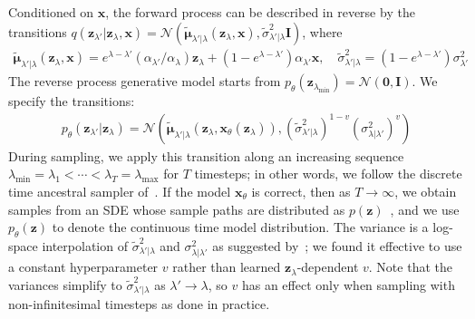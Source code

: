 \documentclass{article} %
\newcommand{\bI}{\mathbf{I}}
\newcommand{\bzero}{\mathbf{0}}
\newcommand{\bx}{\mathbf{x}}
\newcommand{\bz}{\mathbf{z}}
\newcommand{\bmu}{{\boldsymbol{\mu}}}
\begin{document}
Conditioned on $\bx$, the forward process can be described in reverse by the transitions
$q(\bz_{\lambda'}|\bz_\lambda,\bx) = \mathcal{N}(\tilde\bmu_{\lambda'|\lambda}(\bz_\lambda,\bx), \tilde\sigma^2_{\lambda'|\lambda}\bI)$,
where
\begin{align}
\tilde\bmu_{\lambda'|\lambda}(\bz_\lambda,\bx) = e^{\lambda-\lambda'}(\alpha_{\lambda'}/\alpha_{\lambda})\bz_\lambda + (1-e^{\lambda - \lambda'})\alpha_{\lambda'}\bx,
\quad \tilde\sigma^2_{\lambda'|\lambda} = (1-e^{\lambda-\lambda'})\sigma_{\lambda'}^2
\end{align}
The reverse process generative model starts from $p_\theta(\bz_{\lambda_{\mathrm{min}}}) = \mathcal{N}(\bzero, \bI)$. We specify the transitions:
\begin{align}p_\theta(\bz_{\lambda'}|\bz_{\lambda}) = \mathcal{N}(\tilde\bmu_{\lambda'|\lambda}(\bz_\lambda,\bx_\theta(\bz_\lambda)),  (\tilde\sigma^2_{\lambda'|\lambda})^{1-v} (\sigma^2_{\lambda|\lambda'})^v)\end{align}
During sampling, we apply this transition along an increasing sequence $\lambda_{\mathrm{min}} = \lambda_1 < \cdots < \lambda_T = \lambda_{\mathrm{max}}$ for $T$ timesteps; in other words, we follow the discrete time ancestral sampler of~\citet{sohl2015deep,ho2020denoising}. If the model $\bx_\theta$ is correct, then as $T\rightarrow\infty$, we obtain samples from an SDE whose sample paths are distributed as $p(\bz)$~\citep{song2020score}, and we use $p_\theta(\bz)$ to denote the continuous time model distribution. 
The variance is a log-space interpolation of $\tilde\sigma^2_{\lambda'|\lambda}$ and $\sigma^2_{\lambda|\lambda'}$ as suggested by~\citet{nichol2021improved}; we found it effective to use a constant hyperparameter $v$ rather than learned $\bz_\lambda$-dependent $v$. Note that the variances simplify to $\tilde\sigma^2_{\lambda'|\lambda}$ as $\lambda'\rightarrow\lambda$, so $v$ has an effect only when sampling with non-infinitesimal timesteps as done in practice.
\end{document}
